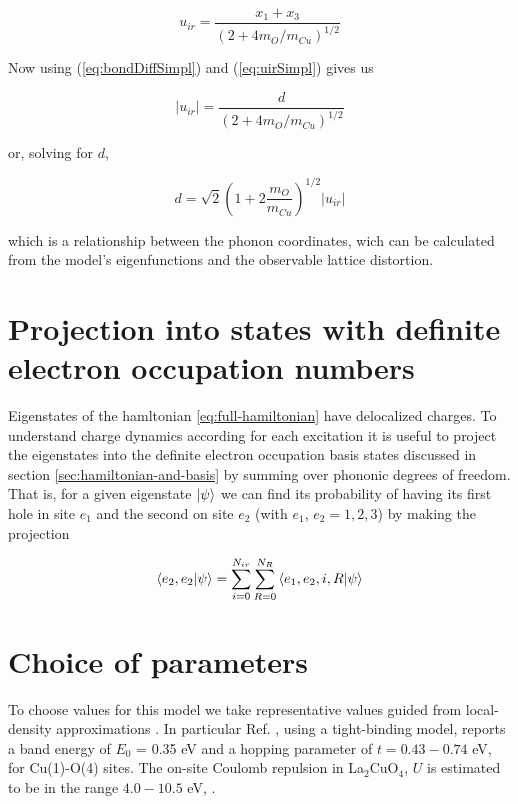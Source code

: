 \begin{equation}\label{eq:uirSimpl}
u_{ir}=\frac{x_1+x_3}{\left( 2+4 m_O/m_{Cu} \right)^{1/2}}
\end{equation}

Now using (\ref{eq:bondDiffSimpl}) and (\ref{eq:uirSimpl}) gives us

\begin{equation}\label{eq:uirvsd}
\left|u_{ir}\right|=\frac{d}{\left( 2+4 m_O/m_{Cu} \right)^{1/2}}
\end{equation}

or, solving for $d$,

\begin{equation}\label{eq:dvsuir}
d=\sqrt{2}\left(1 + 2\frac{m_O}{m_{Cu}} \right)^{1/2}\left|u_{ir}\right|
\end{equation}

which is a relationship between the phonon coordinates, wich can be calculated from the model's eigenfunctions and the observable lattice distortion.

\section{Projection into states with definite electron occupation numbers}

Eigenstates of the hamltonian \ref{eq:full-hamiltonian} have delocalized charges.
To understand charge dynamics according for each excitation it is useful to project the eigenstates into the definite electron occupation basis states discussed in section \ref{sec:hamiltonian-and-basis} by summing over phononic degrees of freedom.
That is, for a given eigenstate $\left | \psi \right\rangle$ we can find its probability of having its first hole in site $e_1$ and the second on site $e_2$ (with $e_1$, $e_2=1,2,3$) by making the projection

\begin{equation}\label{eq:electron-occupation}
\left\langle e_2,e_2|\psi\right\rangle = \sum_{i=0}^{N_{ir}}\sum_{R=0}^{N_R} \left\langle e_1,e_2,i,R|\psi\right\rangle
\end{equation}

\section{Choice of parameters}

To choose values for this model we take representative values guided from local-density approximations \cite{Pickett1989}. 
In particular Ref. \cite{DeWeert1989}, using a tight-binding model, reports a band energy of $E_0$ = 0.35 eV and a hopping parameter of $t=0.43-0.74$ eV, for Cu(1)-O(4) sites.
The on-site Coulomb repulsion in La$_2$CuO$_4$, $U$  is estimated to be in the range $4.0-10.5$ eV, \cite{Hybertsen1989}. 

